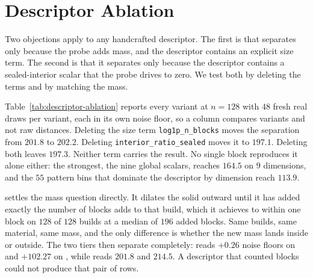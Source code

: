 \section{Descriptor Ablation}
\label{app:descriptor}

Two objections apply to any handcrafted descriptor. The first is that \vkid{}
separates \solidify{} only because the probe adds mass, and the descriptor
contains an explicit size term. The second is that it separates \solidify{} only
because the descriptor contains a sealed-interior scalar that the probe drives to
zero. We test both by deleting the terms and by matching the mass.

Table~\ref{tab:descriptor-ablation} reports every variant at $n{=}128$ with $48$
fresh real draws per variant, each in its own noise floor, so a column compares
variants and not raw distances. Deleting the size term \texttt{log1p\_n\_blocks}
moves the separation from $201.8$ to $202.2$. Deleting
\texttt{interior\_ratio\_sealed} moves it to $197.1$. Deleting both leaves
$197.3$. Neither term carries the result. No single block reproduces it alone
either: the strongest, the nine global scalars, reaches $164.5$ on $9$
dimensions, and the $55$ pattern bins that dominate the descriptor by dimension
reach $113.9$.

\growshell{} settles the mass question directly. It dilates the solid outward
until it has added exactly the number of blocks \solidify{} adds to that build,
which it achieves to within one block on $128$ of $128$ builds at a median of
$196$ added blocks. Same builds, same material, same mass, and the only
difference is whether the new mass lands inside or outside. The two tiers then
separate completely: \mvkid{} reads $+0.26$ noise floors on \solidify{} and
$+102.27$ on \growshell{}, while \vkid{} reads $201.8$ and $214.5$. A descriptor
that counted blocks could not produce that pair of rows.

